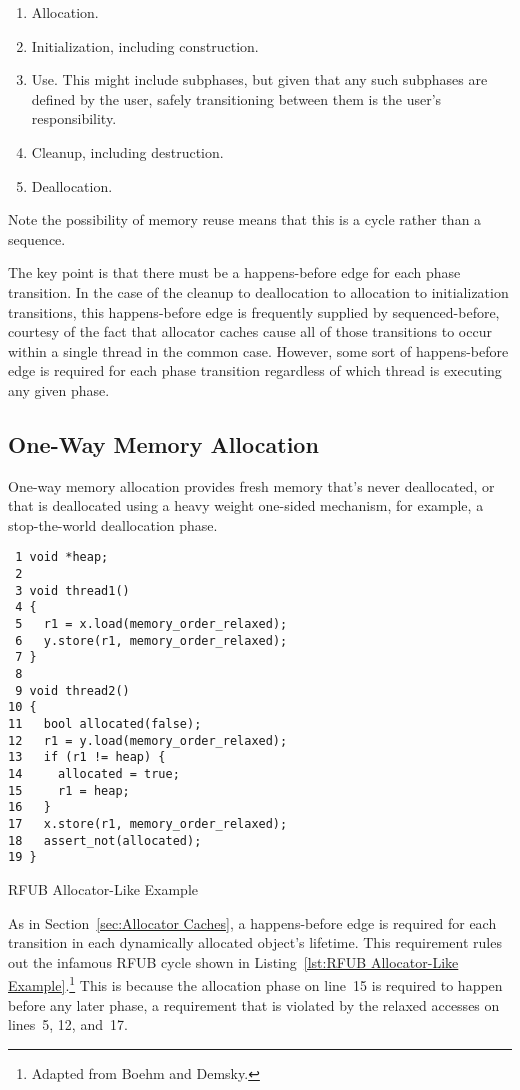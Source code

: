 \documentclass[10]{article}
\begin{document}
\begin{enumerate}
\item	Allocation.
\item	Initialization, including construction.
\item	Use.
	This might include subphases, but given that any such
	subphases are defined by the user, safely transitioning between
	them is the user's responsibility.
\item	Cleanup, including destruction.
\item	Deallocation.
\end{enumerate}

Note the possibility of memory reuse means that this is a cycle rather
than a sequence.

The key point is that there must be a happens-before edge for each
phase transition.
In the case of the cleanup to deallocation to allocation to initialization
transitions, this happens-before edge is frequently supplied by
sequenced-before, courtesy of the fact that allocator caches cause
all of those transitions to occur within a single thread in the common
case.
However, some sort of happens-before edge is required for each phase
transition regardless of which thread is executing any given phase.

\subsection{One-Way Memory Allocation}
\label{sec:One-Way Memory Allocation}

One-way memory allocation provides fresh memory that's never deallocated,
or that is deallocated using a heavy weight one-sided mechanism, for
example, a stop-the-world deallocation phase.

\begin{listing}[tbp]
\begin{verbatim}
 1 void *heap;
 2
 3 void thread1()
 4 {
 5   r1 = x.load(memory_order_relaxed);
 6   y.store(r1, memory_order_relaxed);
 7 }
 8
 9 void thread2()
10 {
11   bool allocated(false);
12   r1 = y.load(memory_order_relaxed);
13   if (r1 != heap) {
14     allocated = true;
15     r1 = heap;
16   }
17   x.store(r1, memory_order_relaxed);
18   assert_not(allocated);
19 }
\end{verbatim}
\caption{RFUB Allocator-Like Example}
\label{lst:RFUB Allocator-Like Example}
\end{listing}

As in
Section~\ref{sec:Allocator Caches},
a happens-before edge is required for each transition in each
dynamically allocated object's lifetime.
This requirement rules out the infamous RFUB cycle shown in
Listing~\ref{lst:RFUB Allocator-Like Example}.\footnote{
	Adapted from Boehm and
	Demsky\cite[Figure 5]{Boehm:2014:OGA:2618128.2618134}.}
This is because the allocation phase on line~15 is required to happen
before any later phase, a requirement that is violated by the relaxed
accesses on lines~5, 12, and~17.
\end{document}
